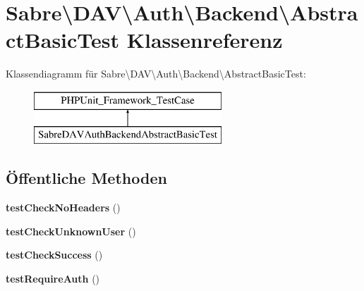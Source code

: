 \hypertarget{class_sabre_1_1_d_a_v_1_1_auth_1_1_backend_1_1_abstract_basic_test}{}\section{Sabre\textbackslash{}D\+AV\textbackslash{}Auth\textbackslash{}Backend\textbackslash{}Abstract\+Basic\+Test Klassenreferenz}
\label{class_sabre_1_1_d_a_v_1_1_auth_1_1_backend_1_1_abstract_basic_test}
Klassendiagramm für Sabre\textbackslash{}D\+AV\textbackslash{}Auth\textbackslash{}Backend\textbackslash{}Abstract\+Basic\+Test\+:\begin{figure}[H]
\begin{center}
\leavevmode
\includegraphics[height=2.000000cm]{class_sabre_1_1_d_a_v_1_1_auth_1_1_backend_1_1_abstract_basic_test}
\end{center}
\end{figure}
\subsection*{Öffentliche Methoden}
\begin{DoxyCompactItemize}
\item 
\mbox{\label{class_sabre_1_1_d_a_v_1_1_auth_1_1_backend_1_1_abstract_basic_test_a245bcaf1d1cd16ead01b9113d33b76bf}} 
{\bfseries test\+Check\+No\+Headers} ()
\item 
\mbox{\label{class_sabre_1_1_d_a_v_1_1_auth_1_1_backend_1_1_abstract_basic_test_a18186334dff8f9a2c728a683d8445ec5}} 
{\bfseries test\+Check\+Unknown\+User} ()
\item 
\mbox{\label{class_sabre_1_1_d_a_v_1_1_auth_1_1_backend_1_1_abstract_basic_test_aa1611b847f0883ac7d9cd5e7b5c7866c}} 
{\bfseries test\+Check\+Success} ()
\item 
\mbox{\label{class_sabre_1_1_d_a_v_1_1_auth_1_1_backend_1_1_abstract_basic_test_a48bcd18aa97ff4d22ef34588b486ba5d}} 
{\bfseries test\+Require\+Auth} ()
\end{DoxyCompactItemize}


